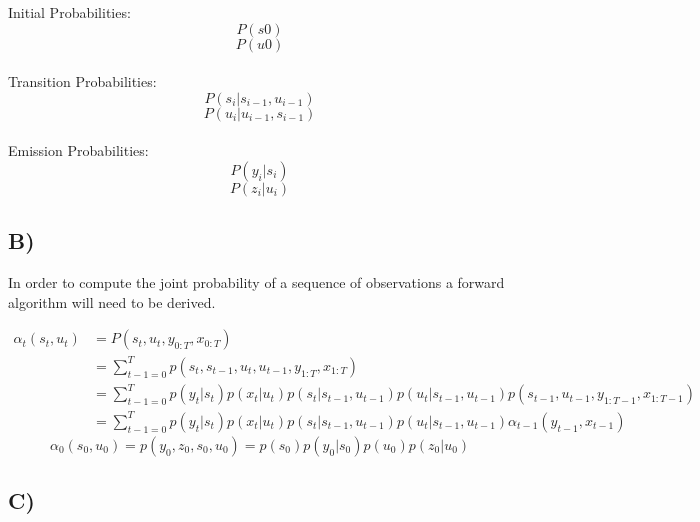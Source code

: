 \documentclass{report}
\begin{document}
Initial Probabilities:
\begin{equation}
  P(s0)
\end{equation}
\begin{equation}
  P(u0)
\end{equation}\\

Transition Probabilities:
\begin{equation}
  P(s_i | s_{i-1}, u_{i-1})
\end{equation}
\begin{equation}
  P(u_i | u_{i-1}, s_{i-1})
\end{equation}\\

Emission Probabilities:
\begin{equation}
  P(y_i | s_i)
\end{equation}
\begin{equation}
  P(z_i | u_i)
\end{equation}

\subsection*{B)}
In order to compute the joint probability of a sequence of observations a
forward algorithm will need to be derived.


\begin{equation}
  \begin{aligned}
  \alpha_t(s_t, u_t) & = P(s_t, u_t, y_{0:T}, x_{0:T})\\
   & = \sum_{t-1 = 0}^T p(s_t, s_{t-1}, u_t, u_{t-1}, y_{1:T}, x_{1:T})\\
   & = \sum_{t-1 = 0}^T p(y_t | s_t) p(x_t | u_t) p(s_t | s_{t-1}, u_{t-1}) p(u_t | s_{t-1}, u_{t-1}) p(s_{t-1}, u_{t-1}, y_{1:T-1}, x_{1:T-1})\\
   & = \sum_{t-1 = 0}^T p(y_t | s_t) p(x_t | u_t) p(s_t | s_{t-1}, u_{t-1}) p(u_t | s_{t-1}, u_{t-1}) \alpha_{t-1}(y_{t-1}, x_{t-1})
  \end{aligned}
\end{equation}
\begin{equation}
  \alpha_0 (s_0, u_0) = p(y_0, z_0, s_0, u_0) = p(s_0) p(y_0 | s_0) p(u_0) p(z_0 | u_0)
\end{equation}


\subsection*{C)}
\end{document}

